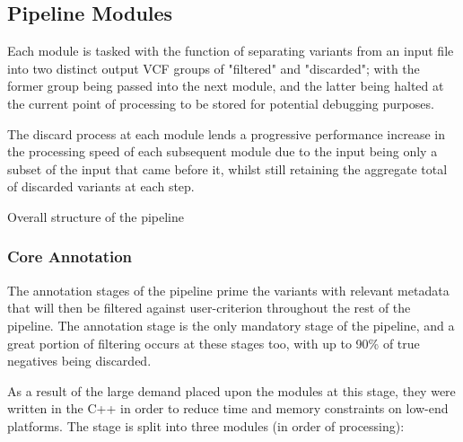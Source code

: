 \subsection{Pipeline Modules}

Each module is tasked with the function of separating variants from an input file into two distinct output VCF groups of "filtered" and "discarded"; with the former group being passed into the next module, and the latter being halted at the current point of processing to be stored for potential debugging purposes.

The discard process at each module lends a progressive performance increase in the processing speed of each subsequent module due to the input being only a subset of the input that came before it, whilst still retaining the aggregate total of discarded variants at each step.


 {Overall structure of the \app pipeline}

\subsubsection{Core Annotation}

The annotation stages of the pipeline prime the variants with relevant metadata that will then be filtered against user-criterion throughout the rest of the pipeline. The annotation stage is the only mandatory stage of the pipeline, and a great portion of filtering occurs at these stages too, with up to 90\% of  true negatives being discarded.

As a result of the large demand placed upon the modules at this stage, they were written in the C++ in order to reduce time and memory constraints on low-end platforms. The stage is split into three modules (in order of processing): 

\begin{itemize}

\end{itemize}

